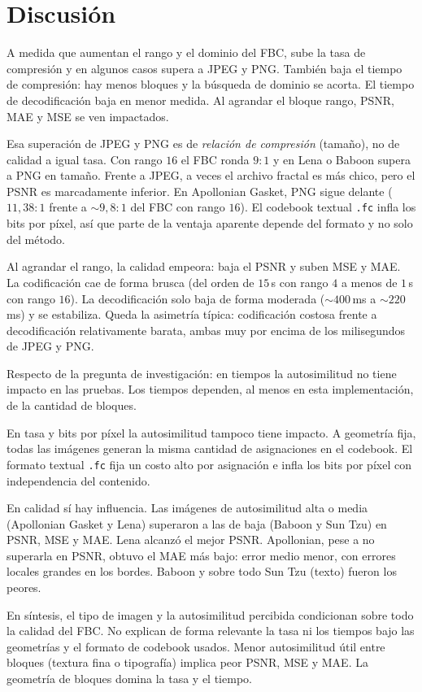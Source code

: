 
\section{Discusión}
\label{sec:discusion}

A medida que aumentan el rango y el dominio del FBC, sube la tasa de compresión y en algunos casos supera a JPEG y PNG. También baja el tiempo de compresión: hay menos bloques y la búsqueda de dominio se acorta. El tiempo de decodificación baja en menor medida. Al agrandar el bloque rango, PSNR, MAE y MSE se ven impactados.

Esa superación de JPEG y PNG es de \emph{relación de compresión} (tamaño), no de calidad a igual tasa. Con rango $16$ el FBC ronda $9{:}1$ y en Lena o Baboon supera a PNG en tamaño. Frente a JPEG, a veces el archivo fractal es más chico, pero el PSNR es marcadamente inferior. En Apollonian Gasket, PNG sigue delante ($11{,}38{:}1$ frente a $\sim 9{,}8{:}1$ del FBC con rango $16$). El codebook textual \texttt{.fc} infla los bits por píxel, así que parte de la ventaja aparente depende del formato y no solo del método.

Al agrandar el rango, la calidad empeora: baja el PSNR y suben MSE y MAE. La codificación cae de forma brusca (del orden de $15$\,s con rango $4$ a menos de $1$\,s con rango $16$). La decodificación solo baja de forma moderada ($\sim 400$\,ms a $\sim 220$\,ms) y se estabiliza. Queda la asimetría típica: codificación costosa frente a decodificación relativamente barata, ambas muy por encima de los milisegundos de JPEG y PNG.

Respecto de la pregunta de investigación: en tiempos la autosimilitud no tiene impacto en las pruebas. Los tiempos dependen, al menos en esta implementación, de la cantidad de bloques.

En tasa y bits por píxel la autosimilitud tampoco tiene impacto. A geometría fija, todas las imágenes generan la misma cantidad de asignaciones en el codebook. El formato textual \texttt{.fc} fija un costo alto por asignación e infla los bits por píxel con independencia del contenido.

En calidad sí hay influencia. Las imágenes de autosimilitud alta o media (Apollonian Gasket y Lena) superaron a las de baja (Baboon y Sun Tzu) en PSNR, MSE y MAE. Lena alcanzó el mejor PSNR. Apollonian, pese a no superarla en PSNR, obtuvo el MAE más bajo: error medio menor, con errores locales grandes en los bordes. Baboon y sobre todo Sun Tzu (texto) fueron los peores.

En síntesis, el tipo de imagen y la autosimilitud percibida condicionan sobre todo la calidad del FBC. No explican de forma relevante la tasa ni los tiempos bajo las geometrías y el formato de codebook usados. Menor autosimilitud útil entre bloques (textura fina o tipografía) implica peor PSNR, MSE y MAE. La geometría de bloques domina la tasa y el tiempo.
